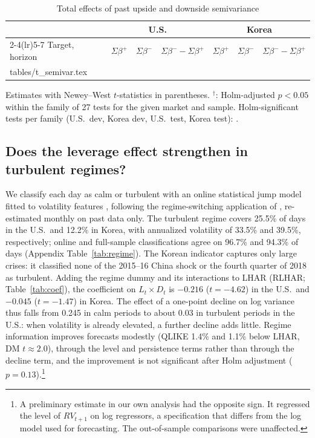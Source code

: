 \documentclass[11pt]{article}
\makeatletter
\newcommand\inputtable[1]{\@@input #1 }
\makeatother
\begin{document}
\begin{table}[!htbp]
\centering
\begin{threeparttable}
\caption{Total effects of past upside and downside semivariance}\label{tab:semivar}
\scriptsize
\begin{tabular}{lcccccc}
\toprule
 & \multicolumn{3}{c}{U.S.} & \multicolumn{3}{c}{Korea} \\
\cmidrule(lr){2-4}\cmidrule(lr){5-7}
Target, horizon & $\Sigma\beta^{+}$ & $\Sigma\beta^{-}$ & $\Sigma\beta^{-}-\Sigma\beta^{+}$ & $\Sigma\beta^{+}$ & $\Sigma\beta^{-}$ & $\Sigma\beta^{-}-\Sigma\beta^{+}$ \\
\midrule
\inputtable{tables/t_semivar.tex}
\bottomrule
\end{tabular}
\begin{tablenotes}\footnotesize
\item Estimates with Newey--West $t$-statistics in parentheses. $^{\dagger}$: Holm-adjusted $p<0.05$ within the family of 27 tests for the given market and sample. Holm-significant tests per family (U.S.\ dev, Korea dev, U.S.\ test, Korea test): .
\end{tablenotes}
\end{threeparttable}
\end{table}

\subsection{Does the leverage effect strengthen in turbulent regimes?}

We classify each day as calm or turbulent with an online statistical jump model fitted to volatility features \citep{nystrup2020}, following the regime-switching application of \citet{shu2024}, re-estimated monthly on past data only. The turbulent regime covers 25.5\% of days in the U.S.\ and 12.2\% in Korea, with annualized volatility of 33.5\% and 39.5\%, respectively; online and full-sample classifications agree on 96.7\% and 94.3\% of days (Appendix Table~\ref{tab:regime}). The Korean indicator captures only large crises: it classified none of the 2015--16 China shock or the fourth quarter of 2018 as turbulent. Adding the regime dummy and its interactions to LHAR (RLHAR; Table~\ref{tab:coef}), the coefficient on $L_t\times D_t$ is $-0.216$ ($t=-4.62$) in the U.S.\ and $-0.045$ ($t=-1.47$) in Korea. The effect of a one-point decline on log variance thus falls from 0.245 in calm periods to about 0.03 in turbulent periods in the U.S.: when volatility is already elevated, a further decline adds little. Regime information improves forecasts modestly (QLIKE 1.4\% and 1.1\% below LHAR, DM $t\approx2.0$), through the level and persistence terms rather than through the decline term, and the improvement is not significant after Holm adjustment ($p=0.13$).\footnote{A preliminary estimate in our own analysis had the opposite sign. It regressed the level of $RV_{t+1}$ on log regressors, a specification that differs from the log model used for forecasting. The out-of-sample comparisons were unaffected.}
\end{document}

